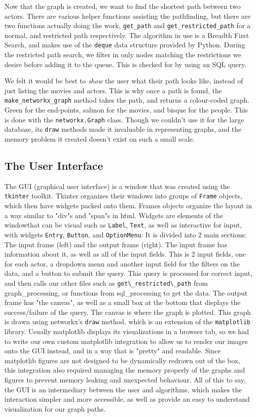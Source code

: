 \documentclass{article}
\begin{document}
Now that the graph is created, we want to find the shortest path between two actors. There are various helper functions assisting the pathfinding, but there are two functions actually doing the work, \verb+get_path+ and \verb+get_restricted_path+ for a normal, and restricted path respectively. The algorithm in use is a Breadth First Search, and makes use of the \verb+deque+ data structure provided by Python. During the restricted path search, we filter in only nodes matching the restrictions we desire before adding it to the queue. This is checked for by using an SQL query.

We felt it would be best to \emph{show} the user what their path looks like, instead of just listing the movies and actors. This is why once a path is found, the \verb!make_networkx_graph! method takes the path, and returns a colour-coded graph. Green for the end-points, salmon for the movies, and bisque for the people. This is done with the \verb+networkx.Graph+ class. Though we couldn't use it for the large database, its \verb!draw! methods made it invaluable in representing graphs, and the memory problem it created doesn't exist on such a small scale.

\subsection{The User Interface}
The GUI (graphical user interface) is a window that was created using the \verb!tkinter! toolkit. Tkinter organizes their windows into groups of \verb!Frame! objects, which then have widgets packed onto them. Frames objects organize the layout in a way similar to "div"s and "span"s in html. Widgets are elements of the windowthat can be visual such as \verb!Label!, \verb!Text!, as well as interactive for input, with widgets \verb!Entry!, \verb!Button!, and \verb!OptionMenu!. It is divided into 2 main sections: The input frame (left) and the output frame (right). The input frame has information about it, as well as all of the input fields. This is 2 input fields, one for each actor, a dropdown menu and another input field for the filters on the data, and a button to submit the query. This query is processed for correct input, and then calls our other files such as \verb!get\_restricted\_path! from graph\_processing, or functions from sql\_processing to get the data. The output frame has "the canvas", as well as a small box at the bottom that displays the success/failure of the query. The canvas is where the graph is plotted. This graph is drawn using networkx's \verb!draw! method, which is an extension of the \verb!matplotlib! library. Usually matplotlib displays its visualizations in a browser tab, so we had to write our own custom matplotlib integration to allow us to render our images onto the GUI instead, and in a way that is "pretty" and readable. Since matplotlib figures are not designed to be dynamically redrawn out of the box, this integration also required managing the memory properly of the graphs and figures to prevent memory leaking and unexpected behaviour. All of this to say, the GUI is an intermediary between the user and algorithms, which makes the interaction simpler and more accessible, as well as provide an easy to understand visualization for our graph paths.
\end{document}
